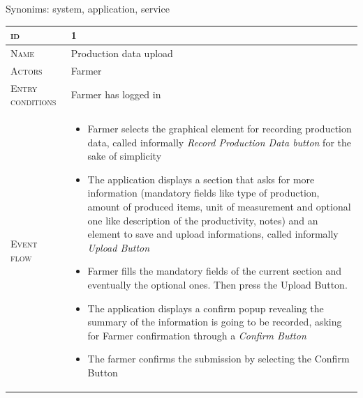 Synonims: system, application, service


\begin{table}[H]
    \centering
    \begin{tabular}[c]{|l|p{}|}
        \hline %
    	\textsc{id}                 &   1\\
    	\hline %
    	\textsc{Name}               &   Production data upload\\
    	\hline %
    	\textsc{Actors}             &   Farmer\\
    	\hline %
    	\textsc{Entry conditions}   &   Farmer has logged in\\
    	\hline %
    	\textsc{Event flow}         &   %
            	                        \begin{itemize}
                                    	    \item Farmer selects the graphical element for recording production data, called informally \textit{Record Production Data button} for the sake of simplicity
                                    		\item The application displays a section that asks for more information (mandatory fields like type of production, amount of produced items, unit of measurement and optional one like description of the productivity, notes) and an element to save and upload informations, called informally \textit{Upload Button}
                                    		\item Farmer fills the mandatory fields of the current section and eventually the optional ones. Then press the Upload Button.
                                    		\item The application displays a confirm popup revealing the summary of the information is going to be recorded, asking for Farmer confirmation through a \textit{Confirm Button}
                                    		\item The farmer confirms the submission by selecting the Confirm Button
                                        \end{itemize}\\

\end{tabular}
\end{table}
